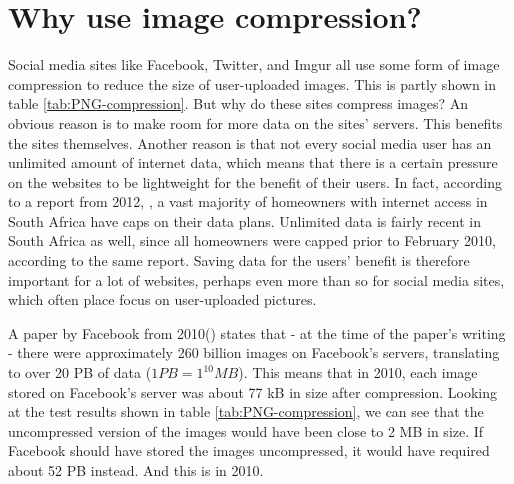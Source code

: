 \section{Why use image compression?}
Social media sites like Facebook, Twitter, and Imgur all use some form of image compression to reduce the size of user-uploaded images.
This is partly shown in table \ref{tab:PNG-compression}.
But why do these sites compress images?
An obvious reason is to make room for more data on the sites' servers.
This benefits the sites themselves.
Another reason is that not every social media user has an unlimited amount of internet data, which means that there is a certain pressure on the websites to be lightweight for the benefit of their users.
In fact, according to a report from 2012, \citep{chetty_2012}, a vast majority of homeowners with internet access in South Africa have caps on their data plans.
Unlimited data is fairly recent in South Africa as well, since all homeowners were capped prior to February 2010, according to the same report.
Saving data for the users' benefit is therefore important for a lot of websites, perhaps even more than so for social media sites, which often place focus on user-uploaded pictures.

A paper by Facebook from 2010(\citep{beaver2010}) states that - at the time of the paper's writing - there were approximately 260 billion images on Facebook's servers, translating to over 20 PB of data ($1 PB = 1^{10} MB$).
This means that in 2010, each image stored on Facebook's server was about 77 kB in size after compression.
Looking at the test results shown in table \ref{tab:PNG-compression}, we can see that the uncompressed version of the images would have been close to 2 MB in size.
If Facebook should have stored the images uncompressed, it would have required about 52 PB instead.
And this is in 2010.
